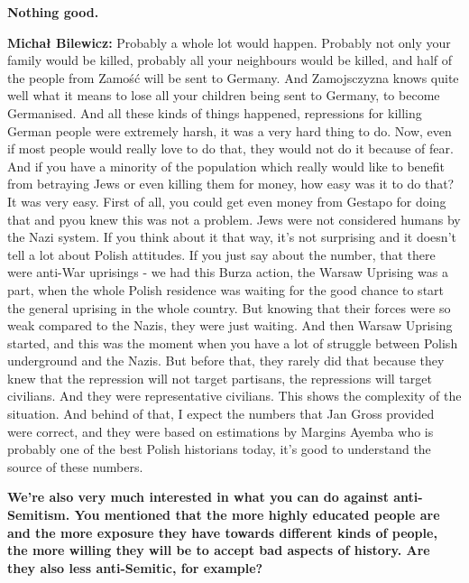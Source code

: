 \textbf{Nothing good.}

\textbf{Michał Bilewicz:} Probably a whole lot would happen. Probably not only your family would be killed, probably all your neighbours would be killed, and half of the people from Zamość will be sent to Germany. And Zamojsczyzna knows quite well what it means to lose all your children being sent to Germany, to become Germanised. And all these kinds of things happened, repressions for killing German people were extremely harsh, it was a very hard thing to do. Now, even if most people would really love to do that, they would not do it because of fear. And if you have a minority of the population which really would like to benefit from betraying Jews or even killing them for money, how easy was it to do that? It was very easy. First of all, you could get even money from Gestapo for doing that and pyou knew this was not a problem. Jews were not considered humans by the Nazi system. If you think about it that way, it’s not surprising and it doesn’t tell a lot about Polish attitudes. If you just say about the number, that there were anti-War uprisings - we had this Burza action, the Warsaw Uprising was a part, when the whole Polish residence was waiting for the good chance to start the general uprising in the whole country. But knowing that their forces were so weak compared to the Nazis, they were just waiting. And then Warsaw Uprising started, and this was the moment when you have a lot of struggle between Polish underground and the Nazis. But before that, they rarely did that because they knew that the repression will not target partisans, the repressions will target civilians. And they were representative civilians. This shows the complexity of the situation. And behind of that, I expect the numbers that Jan Gross provided were correct, and they were based on estimations by Margins Ayemba who is probably one of the best Polish historians today, it’s good to understand the source of these numbers.  

\textbf{We’re also very much interested in what you can do against anti-Semitism. You mentioned that the more highly educated people are and the more exposure they have towards different kinds of people, the more willing they will be to accept bad aspects of history. Are they also less anti-Semitic, for example?} 

